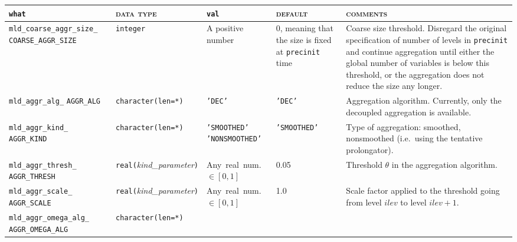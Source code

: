 \bsideways
\begin{center}
\begin{tabular}{|p{5cm}|l|p{2.4cm}|p{2.4cm}|p{6cm}|}
\hline
\verb|what|              & \textsc{data type}        &  \verb|val|      &  \textsc{default}  &
\textsc{comments} \\ \hline
\verb|mld_coarse_aggr_size_|  \break \verb|COARSE_AGGR_SIZE| & \verb|integer|
                         & A positive number
                         & 0, meaning that the size is fixed at
                         \verb|precinit| time
                         & Coarse size threshold. Disregard the
                         original specification of number of levels in
                         \verb|precinit| and continue aggregation
                         until either the global number of variables
                         is below this threshold, or the aggregation
                         does not reduce the size any longer. \\ \hline 
\verb|mld_aggr_alg_|  \break \verb|AGGR_ALG|  & \verb|character(len=*)|
                         & \texttt{'DEC'}
                         & \texttt{'DEC'}
                         & Aggregation algorithm. Currently, only the
                         decoupled aggregation is available. \\ \hline 
\verb|mld_aggr_kind_|  \break \verb|AGGR_KIND|  & \verb|character(len=*)|
                         & \texttt{'SMOOTHED'} \hspace{2.5cm} \texttt{'NONSMOOTHED'}
                         & \texttt{'SMOOTHED'}
                         & Type of aggregation: smoothed, nonsmoothed
                         (i.e.\ using the tentative prolongator). \\ \hline
\verb|mld_aggr_thresh_| \break \verb|AGGR_THRESH| & \verb|real(|\emph{kind\_parameter}\verb|)|
                         & Any~real~num. $\in [0, 1]$
                         & 0.05
                         & Threshold $\theta$ in the aggregation algorithm. \\ \hline
\verb|mld_aggr_scale_| \break \verb|AGGR_SCALE| & \verb|real(|\emph{kind\_parameter}\verb|)|
                         & Any~real~num. $\in [0, 1]$
                         & 1.0
                         & Scale factor applied to the threshold going
 from level $ilev$ to level $ilev+1$. \\ \hline
\verb|mld_aggr_omega_alg_|  \break \verb|AGGR_OMEGA_ALG|& \verb|character(len=*)|

\end{tabular}
\end{center}
